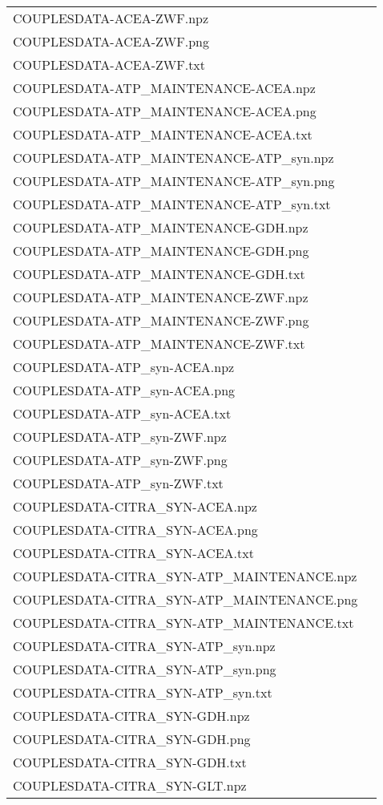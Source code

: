\documentclass[a4paper, parskip=full]{scrreprt}
\begin{document}
\begin{longtable}{ll}
COUPLESDATA-ACEA-ZWF.npz\\
COUPLESDATA-ACEA-ZWF.png\\
COUPLESDATA-ACEA-ZWF.txt\\
COUPLESDATA-ATP\_MAINTENANCE-ACEA.npz\\
COUPLESDATA-ATP\_MAINTENANCE-ACEA.png\\
COUPLESDATA-ATP\_MAINTENANCE-ACEA.txt\\
COUPLESDATA-ATP\_MAINTENANCE-ATP\_syn.npz\\
COUPLESDATA-ATP\_MAINTENANCE-ATP\_syn.png\\
COUPLESDATA-ATP\_MAINTENANCE-ATP\_syn.txt\\
COUPLESDATA-ATP\_MAINTENANCE-GDH.npz\\
COUPLESDATA-ATP\_MAINTENANCE-GDH.png\\
COUPLESDATA-ATP\_MAINTENANCE-GDH.txt\\
COUPLESDATA-ATP\_MAINTENANCE-ZWF.npz\\
COUPLESDATA-ATP\_MAINTENANCE-ZWF.png\\
COUPLESDATA-ATP\_MAINTENANCE-ZWF.txt\\
COUPLESDATA-ATP\_syn-ACEA.npz\\
COUPLESDATA-ATP\_syn-ACEA.png\\
COUPLESDATA-ATP\_syn-ACEA.txt\\
COUPLESDATA-ATP\_syn-ZWF.npz\\
COUPLESDATA-ATP\_syn-ZWF.png\\
COUPLESDATA-ATP\_syn-ZWF.txt\\
COUPLESDATA-CITRA\_SYN-ACEA.npz\\
COUPLESDATA-CITRA\_SYN-ACEA.png\\
COUPLESDATA-CITRA\_SYN-ACEA.txt\\
COUPLESDATA-CITRA\_SYN-ATP\_MAINTENANCE.npz\\
COUPLESDATA-CITRA\_SYN-ATP\_MAINTENANCE.png\\
COUPLESDATA-CITRA\_SYN-ATP\_MAINTENANCE.txt\\
COUPLESDATA-CITRA\_SYN-ATP\_syn.npz\\
COUPLESDATA-CITRA\_SYN-ATP\_syn.png\\
COUPLESDATA-CITRA\_SYN-ATP\_syn.txt\\
COUPLESDATA-CITRA\_SYN-GDH.npz\\
COUPLESDATA-CITRA\_SYN-GDH.png\\
COUPLESDATA-CITRA\_SYN-GDH.txt\\
COUPLESDATA-CITRA\_SYN-GLT.npz\\

\end{longtable}
\end{document}
